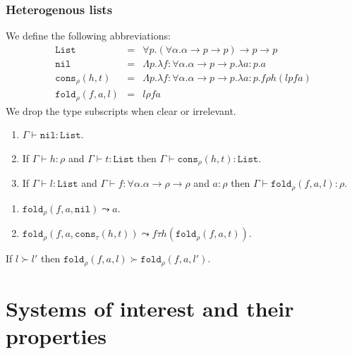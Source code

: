 \documentclass[runningheads,a4paper]{llncs}
\newcommand{\arrtype}{\rightarrow}
\newcommand{\abs}[2]{\lambda #1.#2}
\newcommand{\tabs}[2]{\Lambda #1.#2}
\newcommand{\List}{\mathtt{List}}
\newcommand{\nil}{\mathtt{nil}}
\newcommand{\cons}{\mathtt{cons}}
\newcommand{\fold}{\mathtt{fold}}
\newcommand{\proves}{\vdash}
\begin{document}
\subsubsection{Heterogenous lists}

\begin{definition}\normalfont
  We define the following abbreviations:
  \[
  \begin{array}{rcl}
    \List &=& \forall p . (\forall \alpha . \alpha \arrtype p \arrtype p) \arrtype p \arrtype p \\
    \nil &=& \tabs{p}{\abs{f:\forall \alpha . \alpha \arrtype p \arrtype p}{\abs{a : p}{a}}} \\
    \cons_\rho(h,t) &=& \tabs{p}{\abs{f:\forall\alpha . \alpha \arrtype p \arrtype p}{\abs{a : p}{f \rho h (l p f a)}}} \\
    \fold_\rho(f,a,l) &=& l \rho f a
  \end{array}
  \]
  We drop the type subscripts when clear or irrelevant.
\end{definition}

\begin{lemma}
  \begin{enumerate}
  \item $\Gamma \proves \nil : \List$.
  \item If $\Gamma \proves h : \rho$ and $\Gamma \proves t : \List$
    then $\Gamma \proves \cons_\rho(h,t) : \List$.
  \item If $\Gamma \proves l : \List$ and $\Gamma \proves f : \forall
    \alpha . \alpha \arrtype \rho \arrtype \rho$ and $a : \rho$ then
    $\Gamma \proves \fold_\rho(f,a,l) : \rho$.
  \end{enumerate}
\end{lemma}

\begin{lemma}
  \begin{enumerate}
  \item $\fold_\rho(f,a,\nil) \leadsto a$.
  \item $\fold_\rho(f,a,\cons_\tau(h,t)) \leadsto f \tau h
    (\fold_\rho(f,a,t))$.
  \end{enumerate}
\end{lemma}

\begin{lemma}
  If $l \succ l'$ then $\fold_\rho(f,a,l) \succ \fold_\rho(f,a,l')$.
\end{lemma}

\section{Systems of interest and their properties}\label{sec:systems}
\end{document}
